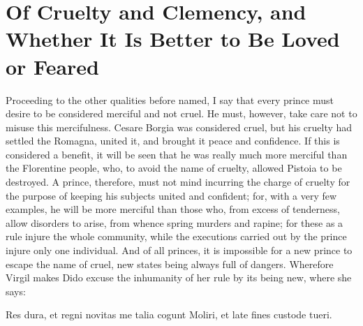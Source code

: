 \documentclass[12pt,letterpaper]{memoir}
\begin{document}
\chapter{Of Cruelty and Clemency, and Whether It Is Better to Be Loved or Feared}

Proceeding to the other qualities before named, I say that every prince
must desire to be considered merciful and not cruel. He must, however,
take care not to misuse this mercifulness. Cesare Borgia was considered
cruel, but his cruelty had settled the Romagna, united it, and brought
it peace and confidence. If this is considered a benefit, it will be
seen that he was really much more merciful than the Florentine people,
who, to avoid the name of cruelty, allowed Pistoia to be destroyed. A
prince, therefore, must not mind incurring the charge of cruelty for
the purpose of keeping his subjects united and confident; for, with a
very few examples, he will be more merciful than those who, from excess
of tenderness, allow disorders to arise, from whence spring murders
and rapine; for these as a rule injure the whole community, while the
executions carried out by the prince injure only one individual. And of
all princes, it is impossible for a new prince to escape the name of
cruel, new states being always full of dangers. Wherefore Virgil makes
Dido excuse the inhumanity of her rule by its being new, where she says:

    Res dura, et regni novitas me talia cogunt
    Moliri, et late fines custode tueri.
\end{document}
